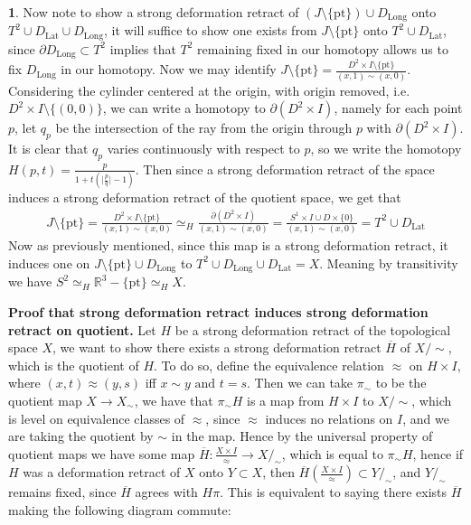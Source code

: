 \documentclass[10.5pt]{article}
\theoremstyle{definition}
\newtheorem{pb}{}
\newcommand{\set}[1]{\{#1\}}
\newcommand{\abs}[1]{\lvert#1\rvert}
\newcommand{\tand}{\text{ and }}
\newcommand{\ism}{\simeq}
\begin{document}
\begin{pb}
        Now note to show a strong deformation retract of \((J \setminus \set{\text{pt}}) \cup D_\text{Long}\) onto \(T^2 \cup D_\text{Lat} \cup D_\text{Long}\), it will suffice to show one
        exists from \(J \setminus \set{\text{pt}}\) onto \(T^2 \cup D_\text{Lat}\), since \(\partial D_\text{Long} \subset T^2\) 
        implies that \(T^2\) remaining fixed in our homotopy allows us to fix
        \(D_\text{Long}\) in our homotopy. Now we may identify \(J \setminus \set{\text{pt}} = \frac{D^2 \times I \setminus \set{\text{pt}}}{(x,1) \sim (x,0)}\). 
        Considering the cylinder centered at the origin, with origin removed, i.e. \(D^2 \times I \setminus \set{(0,0)}\), we can write a homotopy to
        \(\partial(D^2 \times I)\), namely for each point \(p\), let \(q_p\) be the intersection of the ray from the origin through \(p\) with \(\partial(D^2 \times I)\).
        It is clear that \(q_p\) varies continuously with respect to \(p\), so we write the homotopy \(H(p,t) = \frac{p}{1 + t(\abs{\frac{p}{q}} - 1)}\).
        Then since a strong deformation retract of the space induces a strong deformation retract of the quotient space, we get that
        \begin{align*}
            J \setminus \set{\text{pt}} = \frac{D^2 \times I \setminus \set{\text{pt}}}{(x,1) \sim (x,0)} \ism_H \frac{\partial (D^2 \times I)}{(x,1) \sim (x,0)}
            = \frac{S^1 \times I \cup D \times \set{0}}{(x,1) \sim (x,0)} = T^2 \cup D_{\text{Lat}}
        \end{align*}
        Now as previously mentioned, since this map is a strong deformation retract, it induces one on \(J\setminus\set{\text{pt}}\cup D_\text{Long}\) to
        \(T^2 \cup D_\text{Long} \cup D_\text{Lat} = X\). Meaning by transitivity we have \(S^2 \ism_H \mathbb{R}^3 - \set{\text{pt}} \ism_H X\).

        \textbf{Proof that strong deformation retract induces strong deformation retract on quotient.}
        Let \(H\) be a strong deformation retract of the topological space \(X\), we want to show there exists a strong deformation retract
        \(\overline{H}\) of \(X/\sim\), which is the quotient of \(H \). To do so, define the equivalence relation \(\approx\) on \(H \times I \), where
        \((x,t) \approx (y,s)\) iff \(x \sim y \tand t = s\). Then we can take \(\pi_\sim\) to be the quotient map \(X \to X_\sim\), we have that
        \(\pi_\sim H\) is a map from \(H \times I\) to \(X/\sim \), which is level on equivalence classes of \(\approx\), since \(\approx\) induces no relations on
        \(I\), and we are taking the quotient by \(\sim\) in the map. Hence by the universal property of quotient maps we have some map 
        \(\overline{H}: \frac{X \times I }{\approx} \to X/_\sim\), which is equal to \(\pi_\sim H\), hence if \(H\) was a deformation retract of \(X\) onto
        \(Y \subset X\), then \(\overline{H} (\frac{X \times I }{\approx}) \subset Y/_\sim\), and \(Y/_\sim\) remains fixed, since \(\overline{H}\) agrees with \(H\pi\). This is equivalent
        to saying there exists \(\overline{H}\) making the following diagram commute:
        

\end{pb}
\end{document}
